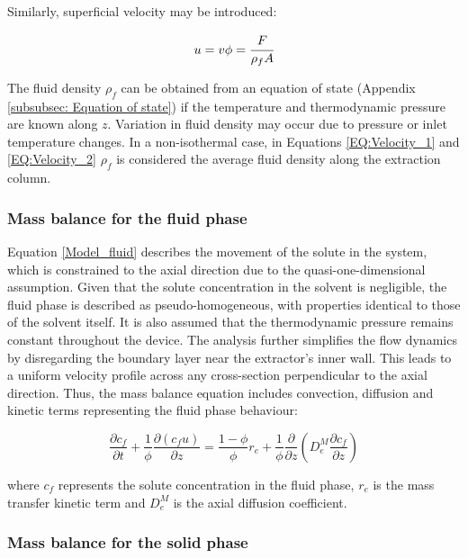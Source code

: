 \documentclass[../Article_Model_Parameters.tex]{subfiles}
\begin{document}
	Similarly, superficial velocity may be introduced:
	
	{\footnotesize
		\begin{equation} \label{EQ:Velocity_2}
			u = v \phi = \cfrac{F}{\rho_f A }
		\end{equation}
	}
	
	The fluid density $\rho_f$ can be obtained from an equation of state (Appendix \ref{subsubsec: Equation of state}) if the temperature and thermodynamic pressure are known along $z$. Variation in fluid density may occur due to pressure or inlet temperature changes. In a non-isothermal case, in Equations \ref{EQ:Velocity_1} and \ref{EQ:Velocity_2} $\rho_f$ is considered the average fluid density along the extraction column.
	
	\subsubsection{Mass balance for the fluid phase} \label{CH: Mass_balance_fluid}
	
	Equation \ref{Model_fluid} describes the movement of the solute in the system, which is constrained to the axial direction due to the quasi-one-dimensional assumption. Given that the solute concentration in the solvent is negligible, the fluid phase is described as pseudo-homogeneous, with properties identical to those of the solvent itself. It is also assumed that the thermodynamic pressure remains constant throughout the device. The analysis further simplifies the flow dynamics by disregarding the boundary layer near the extractor's inner wall. This leads to a uniform velocity profile across any cross-section perpendicular to the axial direction. Thus, the mass balance equation includes convection, diffusion and kinetic terms representing the fluid phase behaviour:
	
	{\footnotesize
		\begin{equation}
			\label{Model_fluid}
			\frac{\partial c_f}{\partial t}
			+ \frac{1}{\phi} \frac{\partial \left( c_f u\right)}{\partial z}
			= \frac{1-\phi}{\phi} r_e
			+ \frac{1}{\phi} \frac{\partial}{\partial z} \left( D^M_e \frac{\partial c_f}{\partial z} \right)
		\end{equation}
	}
	
	where $c_f$ represents the solute concentration in the fluid phase, $r_e$ is the mass transfer kinetic term and $D^M_e$ is the axial diffusion coefficient.
	
	\subsubsection{Mass balance for the solid phase} \label{Mass_balance_solid}
	
\end{document}
